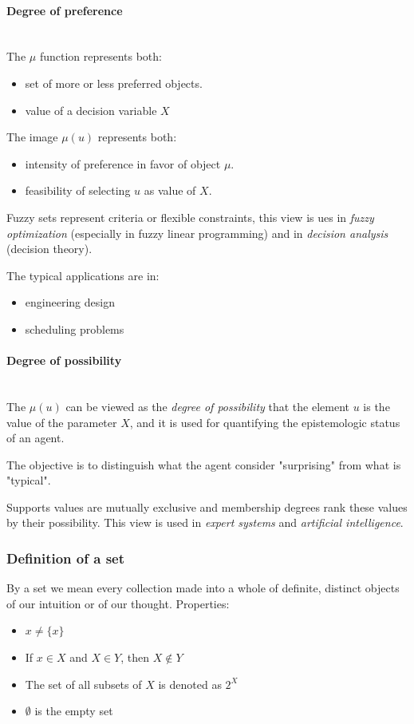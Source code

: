\documentclass{article}
\begin{document}
\paragraph{Degree of preference}\mbox{}\\
The $\mu$ function represents both:
\begin{itemize}
    \item set of more or less preferred objects.
    \item value of a decision variable $X$
\end{itemize}
The image $\mu(u)$ represents both:
\begin{itemize}
    \item intensity of preference in favor of object $\mu$.
    \item feasibility of selecting $u$ as value of $X$.
\end{itemize}

Fuzzy sets represent criteria or flexible constraints, this view is ues in \textit{fuzzy optimization}
(especially in fuzzy linear programming) and in \textit{decision analysis} (decision theory).

The typical applications are in:
\begin{itemize}
    \item engineering design
    \item scheduling problems
\end{itemize}

\paragraph{Degree of possibility}\mbox{}\\
The $\mu(u)$ can be viewed as the \textit{degree of possibility} that the element $u$
is the value of the parameter $X$, and it is used for quantifying the epistemologic status of
an agent.

The objective is to distinguish what the agent consider "surprising" from what is "typical".

Supports values are mutually exclusive and membership degrees rank these values by their
possibility. This view is used in \textit{expert systems} and \textit{artificial intelligence}.

\subsubsection{Definition of a set}
By a set we mean every collection made into a whole of definite, distinct objects of our intuition
or of our thought.
Properties:
\begin{itemize}
    \item $x\neq\{x\}$
    \item If $x\in X$ and $X\in Y$, then $X\notin Y$
    \item The set of all subsets of $X$ is denoted as $2^X$
    \item $\emptyset$ is the empty set
\end{itemize}
\end{document}
